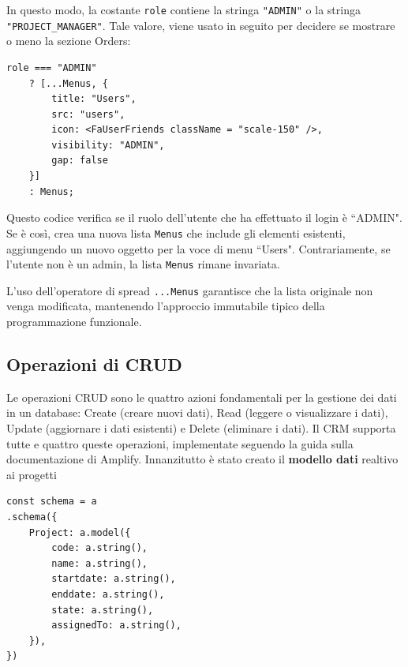 \documentclass[target=bach,aauheader=,style=]{thud}
\begin{document}
\noindent In questo modo, la costante \texttt{role} contiene la stringa \texttt{"ADMIN"} o la stringa  \texttt{"PROJECT\_MANAGER"}. Tale valore, viene usato in seguito per decidere se mostrare o meno la sezione Orders:

\begin{lstlisting}[caption=Verifica ruolo]
role === "ADMIN" 
    ? [...Menus, {
        title: "Users",
        src: "users",
        icon: <FaUserFriends className = "scale-150" />,
        visibility: "ADMIN",
        gap: false
    }]
    : Menus;
\end{lstlisting}

\noindent Questo codice verifica se il ruolo dell'utente che ha effettuato il login è ``ADMIN". Se è così, crea una nuova lista \texttt{Menus} che include gli elementi esistenti, aggiungendo un nuovo oggetto per la voce di menu ``Users". Contrariamente, se l'utente non è un admin, la lista \texttt{Menus} rimane invariata. 

\noindent L'uso dell'operatore di spread \texttt{...Menus} garantisce che la lista originale non venga modificata, mantenendo l'approccio immutabile tipico della programmazione funzionale.

\subsection{Operazioni di CRUD}
Le operazioni CRUD sono le quattro azioni fondamentali per la gestione dei dati in un database: Create (creare nuovi dati), Read (leggere o visualizzare i dati), Update (aggiornare i dati esistenti) e Delete (eliminare i dati). Il CRM supporta tutte e quattro queste operazioni, implementate seguendo la guida \cite{awsamplifynextjs2024} sulla documentazione di Amplify. Innanzitutto è stato creato il \textbf{modello dati} realtivo ai progetti

\begin{lstlisting}[caption=Parte del file \texttt{amplify/data/resource.ts}]
const schema = a
.schema({
    Project: a.model({
        code: a.string(),
        name: a.string(),
        startdate: a.string(),
        enddate: a.string(),
        state: a.string(),
        assignedTo: a.string(),
    }),
})
\end{lstlisting}
\end{document}
